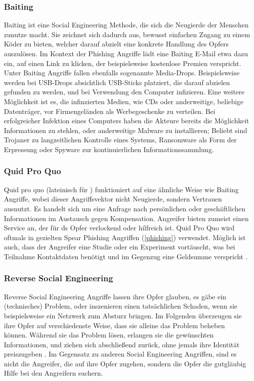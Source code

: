 \subsubsection{Baiting}
\label{baiting}
Baiting ist eine Social Engineering Methode, die sich die Neugierde der Menschen zunutze macht.
Sie zeichnet sich dadurch aus, bewusst einfachen Zugang zu einem Köder zu bieten, welcher darauf abzielt eine konkrete Handlung
des Opfers auszulösen. Im Kontext der Phishing Angriffe lädt eine Baiting E-Mail etwa dazu ein, auf einen Link zu klicken, der beispielsweise
kostenlose Premien verspricht. Unter Baiting Angriffe fallen ebenfalls sogenannte Media-Drops. Beispielsweise werden bei USB-Drops absichtlich
USB-Sticks platziert, die darauf abzielen gefunden zu werden, und bei Verwendung den Computer infizieren. Eine weitere Möglichkeit ist es, die
infinzierten Medien, wie CDs oder anderweitige, beliebige Datenträger, vor Firmengeländen als Werbegeschenke zu verteilen. Bei erfolgreicher Infektion eines Computers haben die Akteure bereits
die Möglichkeit Informationen zu stehlen, oder anderweitige Malware zu installieren; Beliebt sind Trojaner zu langzeitlichen Kontrolle eines
Systems, Ransomware als Form der Erpressung  oder Spyware zur kontinuierlichen Informationssammlung.

\subsubsection{Quid Pro Quo}
Quid pro quo (lateinisch für ) funktioniert auf eine ähnliche Weise wie Baiting Angriffe, wobei dieser Angriffsvektor nicht
Neugierde, sondern Vertrauen ausnutzt. Es handelt sich um eine Anfrage nach persönlichen oder geschäftlichen Informationen im Austausch gegen Kompensation.
Angreifer bieten zumeist einen Service an, der für ds Opfer verlockend oder hilfreich ist. Quid Pro Quo wird oftmals in gezielten
Spear Phishing Angriffen (\autoref{phishing}) verwendet. Möglich ist auch, dass der Angreifer eine Studie oder ein Experiment vortäuscht, was bei Teilnahme Kontaktdaten
benötigt und im Gegenzug eine Geldsumme verspricht .

\subsubsection{Reverse Social Engineering}
Reverse Social Engineering Angriffe lassen ihre Opfer glauben, es gäbe ein (technisches) Problem, oder inszenieren einen tatsächlichen Schaden, wenn sie beispielsweise
ein Netzwerk zum Absturz bringen. Im Folgenden überzeugen sie ihre Opfer auf verschiedenste Weise, dass sie alleine das Problem beheben können. Während sie das Problem
lösen, erlangen sie die gewünschten Informationen, und ziehen sich abschließend zurück, ohne jemals ihre Identität preiszugeben .
Im Gegensatz zu anderen Social Engineering Angriffen, sind es nicht die Angreifer, die auf ihre Opfer zugehen, sondern die Opfer die gutgläubig Hilfe
bei den Angreifern suchern.


